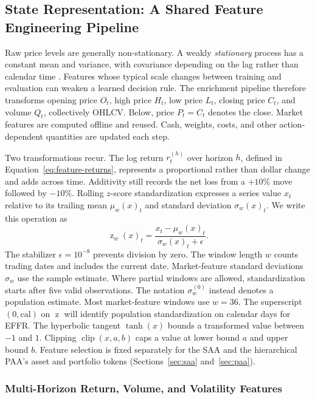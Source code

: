 \subsection{State Representation: A Shared Feature Engineering Pipeline}
\label{sec:state}

Raw price levels are generally non-stationary. A weakly \emph{stationary} process has a constant mean and variance, with covariance depending on the lag rather than calendar time \cite{Schmitt_2013}. Features whose typical scale changes between training and evaluation can weaken a learned decision rule. The enrichment pipeline therefore transforms opening price \(O_t\), high price \(H_t\), low price \(L_t\), closing price \(C_t\), and volume \(Q_t\), collectively OHLCV. Below, price \(P_t=C_t\) denotes the close. Market features are computed offline and reused. Cash, weights, costs, and other action-dependent quantities are updated each step.

Two transformations recur. The log return \(r_t^{(h)}\) over horizon \(h\), defined in Equation~\eqref{eq:feature-returns}, represents a proportional rather than dollar change and adds across time. Additivity still records the net loss from a \(+10\%\) move followed by \(-10\%\). Rolling \(z\)-score standardization expresses a series value \(x_t\) relative to its trailing mean \(\mu_w(x)_t\) and standard deviation \(\sigma_w(x)_t\). We write this operation as
\begin{equation}
\operatorname{z}_{w}(x)_t = \frac{x_t-\mu_w(x)_t}{\sigma_w(x)_t+\epsilon}.
\label{eq:feature-zscore}
\end{equation}
The stabilizer \(\epsilon=10^{-8}\) prevents division by zero. The window length \(w\) counts trading dates and includes the current date. Market-feature standard deviations \(\sigma_w\) use the sample estimate. Where partial windows are allowed, standardization starts after five valid observations. The notation \(\sigma_w^{(0)}\) instead denotes a population estimate. Most market-feature windows use \(w=36\). The superscript \((0,\mathrm{cal})\) on \(\operatorname z\) will identify population standardization on calendar days for EFFR. The hyperbolic tangent \(\tanh(x)\) bounds a transformed value between \(-1\) and \(1\). Clipping \(\operatorname{clip}(x,a,b)\) caps a value at lower bound \(a\) and upper bound \(b\). Feature selection is fixed separately for the SAA and the hierarchical PAA's asset and portfolio tokens (Sections~\ref{sec:saa} and~\ref{sec:paa}).

\subsubsection{Multi-Horizon Return, Volume, and Volatility Features}
\label{sec:state-returns}

